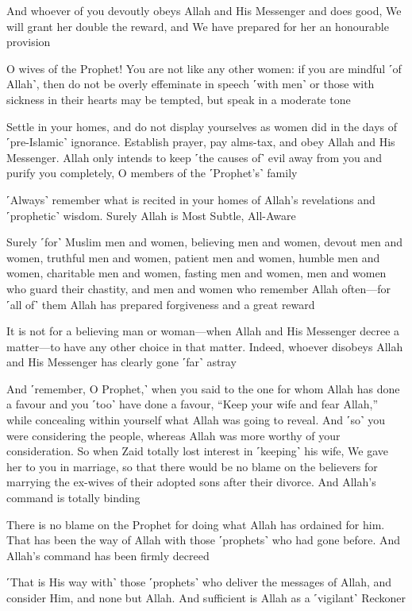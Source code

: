 And whoever of you devoutly obeys Allah and His Messenger and does good, We will grant her double the reward, and We have prepared for her an honourable provision

O wives of the Prophet! You are not like any other women: if you are mindful ˹of Allah˺, then do not be overly effeminate in speech ˹with men˺ or those with sickness in their hearts may be tempted, but speak in a moderate tone

Settle in your homes, and do not display yourselves as women did in the days of ˹pre-Islamic˺ ignorance. Establish prayer, pay alms-tax, and obey Allah and His Messenger. Allah only intends to keep ˹the causes of˺ evil away from you and purify you completely, O members of the ˹Prophet’s˺ family

˹Always˺ remember what is recited in your homes of Allah’s revelations and ˹prophetic˺ wisdom. Surely Allah is Most Subtle, All-Aware

Surely ˹for˺ Muslim men and women, believing men and women, devout men and women, truthful men and women, patient men and women, humble men and women, charitable men and women, fasting men and women, men and women who guard their chastity, and men and women who remember Allah often—for ˹all of˺ them Allah has prepared forgiveness and a great reward

It is not for a believing man or woman—when Allah and His Messenger decree a matter—to have any other choice in that matter. Indeed, whoever disobeys Allah and His Messenger has clearly gone ˹far˺ astray

And ˹remember, O Prophet,˺ when you said to the one for whom Allah has done a favour and you ˹too˺ have done a favour, “Keep your wife and fear Allah,” while concealing within yourself what Allah was going to reveal. And ˹so˺ you were considering the people, whereas Allah was more worthy of your consideration. So when Zaid totally lost interest in ˹keeping˺ his wife, We gave her to you in marriage, so that there would be no blame on the believers for marrying the ex-wives of their adopted sons after their divorce. And Allah’s command is totally binding

There is no blame on the Prophet for doing what Allah has ordained for him. That has been the way of Allah with those ˹prophets˺ who had gone before. And Allah’s command has been firmly decreed

˹That is His way with˺ those ˹prophets˺ who deliver the messages of Allah, and consider Him, and none but Allah. And sufficient is Allah as a ˹vigilant˺ Reckoner

